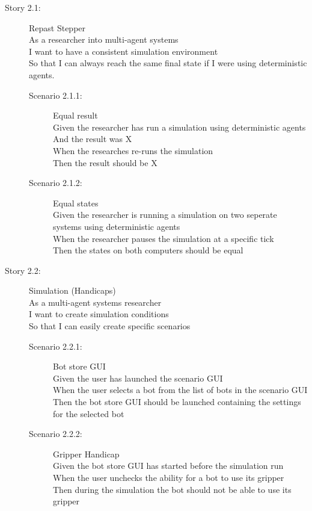  \begin{description}
    \item[Story 2.1:] Repast Stepper\\
    As a researcher into multi-agent systems\\
    I want to have a consistent simulation environment\\
    So that I can always reach the same final state if I were using deterministic agents.
    
        \begin{description}
        \item[Scenario 2.1.1:] Equal result\\
        Given the researcher has run a simulation using deterministic agents\\
        And the result was X\\
        When the researches re-runs the simulation\\
        Then the result should be X
        
        \item[Scenario 2.1.2:] Equal states\\
        Given the researcher is running a simulation on two seperate systems using deterministic agents\\
        When the researcher pauses the simulation at a specific tick\\
        Then the states on both computers should be equal
    \end{description}
  \item[Story 2.2:] Simulation (Handicaps)\\
  As a multi-agent systems researcher\\
  I want to create simulation conditions\\
  So that I can easily create specific scenarios
  
  \begin{description}
    \item[Scenario 2.2.1:] Bot store GUI\\
    Given the user has launched the scenario GUI\\
    When the user selects a bot from the list of bots in the scenario GUI\\
    Then the bot store GUI should be launched containing the settings for the selected bot
    
    \item[Scenario 2.2.2:] Gripper Handicap\\
    Given the bot store GUI has started before the simulation run\\
    When the user unchecks the ability for a bot to use its gripper\\
    Then during the simulation the bot should not be able to use its gripper


\end{description}
\end{description}
